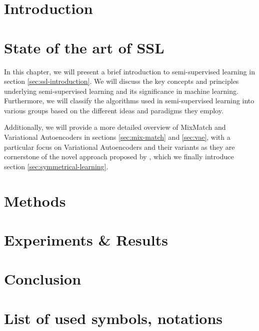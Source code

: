 \documentclass[twoside]{ctuthesis}
\theoremstyle{plain}
\theoremstyle{definition}
\theoremstyle{note}
\begin{document}
\maketitle


\chapter{Introduction}


\chapter{State of the art of SSL}
\label{motivation-theory}
In this chapter, we will present a brief introduction to semi-supervised learning in section \ref{sec:ssl-introduction}. 
We will discuss the key concepts and principles underlying semi-supervised learning and its significance in machine learning. 
Furthermore, we will classify the algorithms used in semi-supervised learning into various groups based on the different 
ideas and paradigms they employ.

Additionally, we will provide a more detailed overview of MixMatch and Variational Autoencoders in sections \ref{sec:mix-match} and \ref{sec:vae}, with
a particular focus on Variational Autoencoders and their variants as they are cornerstone of the novel approach proposed by \cite{sym-learning-2023}, which 
we finally introduce section \ref{sec:symmetrical-learning}.






\chapter{Methods}
\label{methods}






\chapter{Experiments \& Results} 
\label{results}





\chapter{Conclusion}
\label{conclusions}

\printbibliography


\chapter*{List of used symbols, notations}

\end{document}
